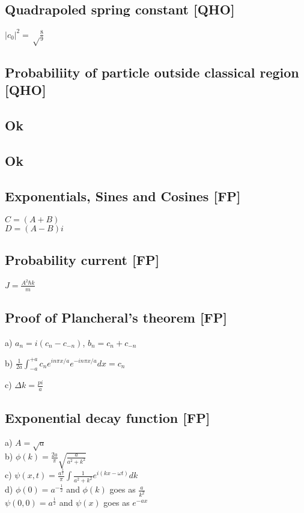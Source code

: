 \documentclass{article}
\newcommand{\half}{\frac{1}{2}}
\newcommand{\<}{\langle}
\renewcommand{\>}{\rangle}
\begin{document}
\subsection{Quadrapoled spring constant [QHO]}

$|c_0|^2 = \sqrt\frac{8}{9}$

\subsection{Probabiliity of particle outside classical region [QHO]}

\subsection{Ok}

\subsection{Ok}

\subsection{Exponentials, Sines and Cosines [FP]}

$C = (A+B)$
\\
$D = (A-B)i$

\subsection{Probability current [FP]}

$J = \frac{A^2\hbar k}{m}$

\subsection{Proof of Plancheral's theorem [FP]}

a) $a_n = i(c_n - c_{-n})$,
$b_n = c_n + c_{-n}$

b) $\frac{1}{2a}\int_{-a}^{+a} c_n e^{in\pi x/a}e^{-in\pi x/a} dx = c_n$

c) $\Delta k = \frac{pi}{a}$

\subsection{Exponential decay function [FP]}

a) $A = \sqrt a$ \\
b) $\phi(k) = \frac{2a}{\pi} \sqrt{\frac{a}{a^2 + k^2}}$ \\
c) $\psi(x,t) = \frac{a^{\frac{3}{2}}}{\pi}\int\frac{1}{a^2+k^2} e^{i(kx-\omega t)} dk$ \\
d) $\phi(0) = a^{-\half}$ and $\phi(k)$ goes as $\frac{a}{k^2}$ \\
$\psi(0,0) = a^\half$ and $\psi(x)$ goes as $e^{-ax}$
\end{document}
